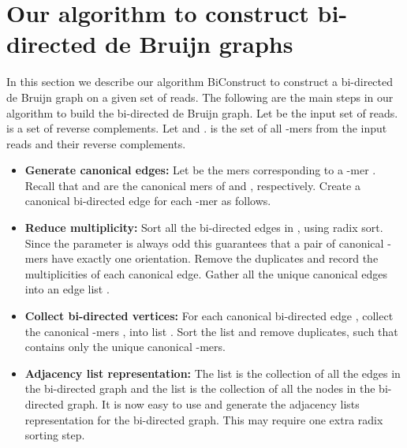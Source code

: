 \documentclass[11pt,conference,twocolumn]{IEEEtran}
\begin{document}
\section{Our algorithm to construct bi-directed de Bruijn graphs}
\label{sec:our_algo}
In this section we describe our algorithm {\sf BiConstruct} to construct a bi-directed de Bruijn 
graph on a given set of reads. The following are the main steps in our algorithm to build the 
bi-directed de Bruijn graph. Let  be the input set of reads. 
 is a set of reverse complements. 
 Let  and . 
 is the set of all -mers from the input reads and their reverse complements.
\begin{itemize}
\item {\sf [STEP-1] }{\bf Generate canonical edges:} 
Let  be the mers corresponding to a 
-mer . Recall that  and  are the canonical
mers of  and , respectively. Create a canonical bi-directed edge  
for each -mer as follows.


\item {\sf [STEP-2] }{\bf Reduce multiplicity:} Sort all the bi-directed edges 
in {\sf [STEP-1]}, using radix sort. Since the parameter  is always odd this
guarantees that a pair of canonical -mers have exactly one orientation. Remove
the duplicates and record the multiplicities of each canonical edge. Gather all the
unique canonical edges into an edge list .

\item {\sf [STEP-3] }{\bf Collect bi-directed vertices:} For each canonical bi-directed edge
, collect the canonical -mers
,  into list . Sort the list  and
remove duplicates, such that  contains only the unique canonical
-mers.

\item {\sf [STEP-4] }{\bf Adjacency list representation:} 
The list  is the collection of all the edges in the bi-directed graph 
and the list  is the collection of all the nodes in the bi-directed 
graph. It is now easy  to use  and generate the adjacency 
lists representation for the bi-directed graph. This may require one extra
radix sorting step.
\end{itemize}
\end{document}
